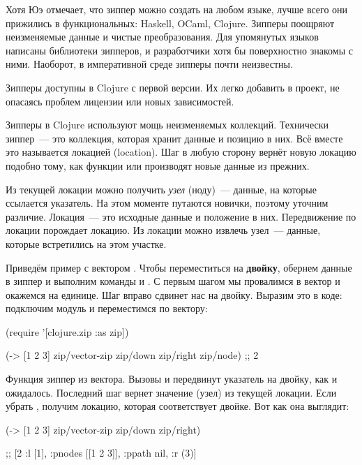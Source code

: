Хотя Юэ отмечает, что зиппер можно создать на любом языке, лучше всего они
прижились в функциональных: Haskell, OCaml, Clojure. Зипперы поощряют
неизменяемые данные и чистые преобразования. Для упомянутых языков написаны
библиотеки зипперов, и разработчики хотя бы поверхностно знакомы с
ними. Наоборот, в императивной среде зипперы почти неизвестны.

Зипперы доступны в Clojure с первой версии. Их легко добавить в проект, не
опасаясь проблем лицензии или новых зависимостей.

Зипперы в Clojure используют мощь неизменяемых коллекций. Технически зиппер~---
это коллекция, которая хранит данные и позицию в них. Всё вместе это называется
локацией (location). Шаг в любую сторону вернёт новую локацию подобно тому, как
функции  или  производят новые данные из прежних.

Из текущей локации можно получить \emph{узел} (ноду)~--- данные, на которые ссылается
указатель. На этом моменте путаются новички, поэтому уточним различие. Локация~---
это исходные данные и положение в них. Передвижение по локации порождает
локацию. Из локации можно извлечь узел~--- данные, которые встретились на этом
участке.

Приведём пример с вектором \code{[1 2 3]}. Чтобы переместиться на \textbf{двойку}, обернем
данные в зиппер и выполним команды  и . С первым шагом мы
провалимся в вектор и окажемся на единице. Шаг вправо сдвинет нас на
двойку. Выразим это в коде: подключим модуль  и переместимся по
вектору:

\begin{english}
  \begin{clojure}
(require '[clojure.zip :as zip])

(-> [1 2 3]
    zip/vector-zip
    zip/down
    zip/right
    zip/node)
;; 2
  \end{clojure}
\end{english}

Функция  зиппер из вектора. Вызовы  и
 передвинут указатель на двойку, как и ожидалось. Последний шаг
 вернет значение (узел) из текущей локации. Если убрать ,
получим локацию, которая соответствует двойке. Вот как она выглядит:

\begin{english}
  \begin{clojure}
(-> [1 2 3]
    zip/vector-zip
    zip/down
    zip/right)

;; [2 {:l [1], :pnodes [[1 2 3]], :ppath nil, :r (3)}]
  \end{clojure}
\end{english}

